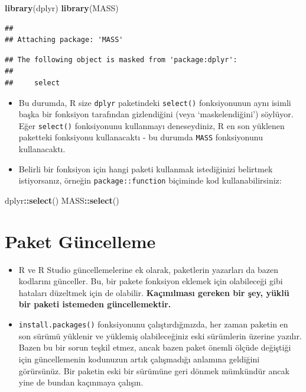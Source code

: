 \documentclass[
  oneside]{book}
\newenvironment{Shaded}{\begin{snugshade}}{\end{snugshade}}
\newcommand{\FunctionTok}[1]{\textcolor[rgb]{0.13,0.29,0.53}{\textbf{#1}}}
\newcommand{\NormalTok}[1]{#1}
\newcommand{\SpecialCharTok}[1]{\textcolor[rgb]{0.81,0.36,0.00}{\textbf{#1}}}
\begin{document}
\begin{Shaded}
\begin{Highlighting}[]
\FunctionTok{library}\NormalTok{(dplyr)}
\FunctionTok{library}\NormalTok{(MASS)}
\end{Highlighting}
\end{Shaded}

\begin{verbatim}
## 
## Attaching package: 'MASS'
\end{verbatim}

\begin{verbatim}
## The following object is masked from 'package:dplyr':
## 
##     select
\end{verbatim}

\begin{itemize}
\item
  Bu durumda, R size \texttt{dplyr} paketindeki \texttt{select()} fonksiyonunun aynı isimli başka bir fonksiyon tarafından gizlendiğini (veya `maskelendiğini') söylüyor. Eğer \texttt{select()} fonksiyonunu kullanmayı deneseydiniz, R en son yüklenen paketteki fonksiyonu kullanacaktı - bu durumda \texttt{MASS} fonksiyonunu kullanacaktı.
\item
  Belirli bir fonksiyon için hangi paketi kullanmak istediğinizi belirtmek istiyorsanız, örneğin \texttt{package::function} biçiminde kod kullanabilirsiniz:
\end{itemize}

\begin{Shaded}
\begin{Highlighting}[]
\NormalTok{dplyr}\SpecialCharTok{::}\FunctionTok{select}\NormalTok{()}
\NormalTok{MASS}\SpecialCharTok{::}\FunctionTok{select}\NormalTok{()}
\end{Highlighting}
\end{Shaded}

\hypertarget{paket-guxfcncelleme}{%
\section{Paket Güncelleme}\label{paket-guxfcncelleme}}

\begin{itemize}
\item
  R ve R Studio güncellemelerine ek olarak, paketlerin yazarları da bazen kodlarını günceller. Bu, bir pakete fonksiyon eklemek için olabileceği gibi hataları düzeltmek için de olabilir. \textbf{Kaçınılması gereken bir şey, yüklü bir paketi istemeden güncellemektir.}
\item
  \texttt{install.packages()} fonksiyonunu çalıştırdığınızda, her zaman paketin en son sürümü yüklenir ve yüklemiş olabileceğiniz eski sürümlerin üzerine yazılır. Bazen bu bir sorun teşkil etmez, ancak bazen paket önemli ölçüde değiştiği için güncellemenin kodunuzun artık çalışmadığı anlamına geldiğini görürsünüz. Bir paketin eski bir sürümüne geri dönmek mümkündür ancak yine de bundan kaçınmaya çalışın.
\end{itemize}
\end{document}
